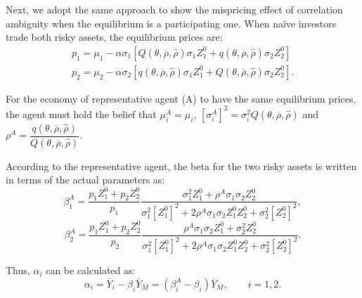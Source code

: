 \documentclass[10pt]{article}
\begin{document}
Next, we adopt the same approach to show the mispricing effect of correlation ambiguity when the equilibrium is a participating one. When na\"ive investors trade both risky assets, the equilibrium prices are:
\begin{eqnarray*}
& p_1 = \mu_1 - \alpha \sigma_1 \left[ Q (\theta, \overline{\rho}, {\hat \rho}) \sigma_1 Z_1^0 + q (\theta, \overline{\rho}, {\hat \rho}) \sigma_2 Z_2^0 \right] & \\
& p_2 = \mu_2 - \alpha \sigma_2 \left[ q (\theta, \overline{\rho}, {\hat \rho}) \sigma_1 Z_1^0 + Q (\theta, \overline{\rho}, {\hat \rho}) \sigma_2 Z_2^0 \right]. &
\end{eqnarray*}

For the economy of representative agent (A) to have the same equilibrium prices, the agent must hold the belief that $ \mu_i^A = \mu_i $, $ \left[ \sigma_i^A \right]^2 = \sigma_i^2 Q (\theta, \overline{\rho}, {\hat \rho}) $ and $ \rho^A = \dfrac{q (\theta, \overline{\rho}, {\hat \rho})}{Q (\theta, \overline{\rho}, {\hat \rho})} $.

According to the representative agent, the beta for the two risky assets is written in terms of the actual parameters as:
\begin{equation*}
\beta_1^A = \dfrac{p_1 Z_1^0 + p_2 Z_2^0}{p_1} \dfrac{\sigma_1^2 Z_1^0 + \rho^A \sigma_1 \sigma_2 Z_2^0}{\sigma_1^2 \left[ Z_1^0 \right]^2 + 2 \rho^A \sigma_1 \sigma_2 Z_1^0 Z_2^0 + \sigma_2^2 \left[ Z_2^0 \right]^2}, 
\end{equation*}
\begin{equation*}
\beta_2^A = \dfrac{p_1 Z_1^0 + p_2 Z_2^0}{p_2} \dfrac{\rho^A \sigma_1 \sigma_2 Z_1^0 + \sigma_2^2 Z_2^0}{\sigma_1^2 \left[ Z_1^0 \right]^2 + 2 \rho^A \sigma_1 \sigma_2 Z_1^0 Z_2^0 + \sigma_2^2 \left[ Z_2^0 \right]^2}. 
\end{equation*}

Thus, $ \alpha_i $ can be calculated as:
\begin{equation*}
\alpha_i = \overline{Y}_i - \beta_i \overline{Y}_{M} = (\beta_i^A - \beta_i) \overline{Y}_M, \qquad i = 1, 2.
\end{equation*}
\end{document}
